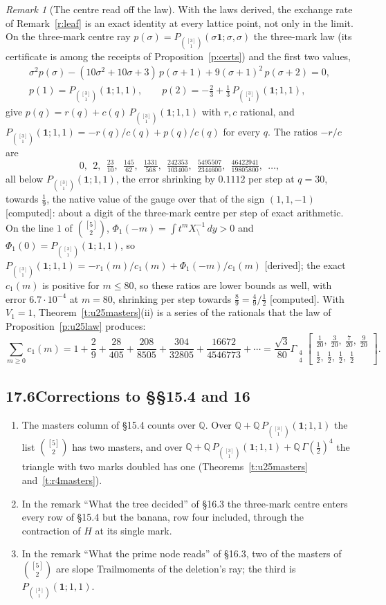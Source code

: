 \documentclass[11pt]{article}
\newcommand{\one}{\mathbf 1}
\newcommand{\Gst}[4]{\Gamma_{\substack{#1\\#2}}\!\begin{bmatrix}#3\\#4\end{bmatrix}}
\newcommand{\Pth}{P_{\binom{[3]}1}(\one;1,1)}
\theoremstyle{plain}
\theoremstyle{definition}
\theoremstyle{remark}
\newtheorem{remark}[proposition]{Remark}
\newcommand{\derived}{\textup{[derived]}}
\newcommand{\computed}{\textup{[computed]}}
\begin{document}
\begin{remark}[The centre read off the law]\label{r:paper}
With the laws derived, the exchange rate of Remark~\ref{r:leaf} is an exact identity at every lattice point, not only in the limit. On the three-mark centre ray $p(\sigma)=P_{\binom{[3]}1}(\sigma\one;\sigma,\sigma)$ the three-mark law (its certificate is among the receipts of Proposition~\ref{p:certs}) and the first two values,
\begin{gather*}
\sigma^2p(\sigma)-(10\sigma^2+10\sigma+3)\,p(\sigma+1)+9(\sigma+1)^2\,p(\sigma+2)=0,\\
p(1)=\Pth,\qquad p(2)=-\tfrac23+\tfrac13\,\Pth,
\end{gather*}
give $p(q)=r(q)+c(q)\,\Pth$ with $r,c$ rational, and $\Pth=-r(q)/c(q)+p(q)/c(q)$ for every $q$. The ratios $-r/c$ are
\[
0,\ \ 2,\ \ \tfrac{23}{10},\ \ \tfrac{145}{62},\ \ \tfrac{1331}{568},\ \ \tfrac{242353}{103400},\ \ \tfrac{5495507}{2344600},\ \ \tfrac{46422941}{19805800},\ \ \dots,
\]
all below $\Pth$, the error shrinking by $0.1112$ per step at $q=30$, towards $\frac19$, the native value of the gauge over that of the sign $(1,1,-1)$ \computed: about a digit of the three-mark centre per step of exact arithmetic. On the line $1$ of $\binom{[5]}2$, $\Phi_1(-m)=\int t^m X_{\setminus}^{-1}\,dy>0$ and $\Phi_1(0)=\Pth$, so $\Pth=-r_1(m)/c_1(m)+\Phi_1(-m)/c_1(m)$ \derived; the exact $c_1(m)$ is positive for $m\le80$, so these ratios are lower bounds as well, with error $6.7\cdot10^{-4}$ at $m=80$, shrinking per step towards $\frac89=\frac49\big/\frac12$ \computed. With $V_1=1$, Theorem~\ref{t:u25masters}(ii) is a series of the rationals that the law of Proposition~\ref{p:u25law} produces:
\[
\sum_{m\ge0}c_1(m)=1+\frac29+\frac{28}{405}+\frac{208}{8505}+\frac{304}{32805}+\frac{16672}{4546773}+\cdots=\frac{\sqrt3}{80}\Gst44{\tfrac1{20},\ \tfrac3{20},\ \tfrac7{20},\ \tfrac9{20}}{\tfrac12,\ \tfrac12,\ \tfrac12,\ \tfrac12}.
\]
\end{remark}

\subsection*{17.6\quad Corrections to \S\S15.4 and 16}

\begin{enumerate}[label=(\roman*)]
\item The masters column of \S15.4 counts over $\mathbb Q$. Over $\mathbb Q+\mathbb Q\,\Pth$ the list $\binom{[5]}2$ has two masters, and over $\mathbb Q+\mathbb Q\,\Pth+\mathbb Q\,\Gamma(\frac12)^4$ the triangle with two marks doubled has one (Theorems~\ref{t:u25masters} and~\ref{t:r4masters}).
\item In the remark ``What the tree decided'' of \S16.3 the three-mark centre enters every row of \S15.4 but the banana, row four included, through the contraction of $H$ at its single mark.
\item In the remark ``What the prime node reads'' of \S16.3, two of the masters of $\binom{[5]}2$ are slope Trailmoments of the deletion's ray; the third is $\Pth$.
\end{enumerate}
\end{document}
